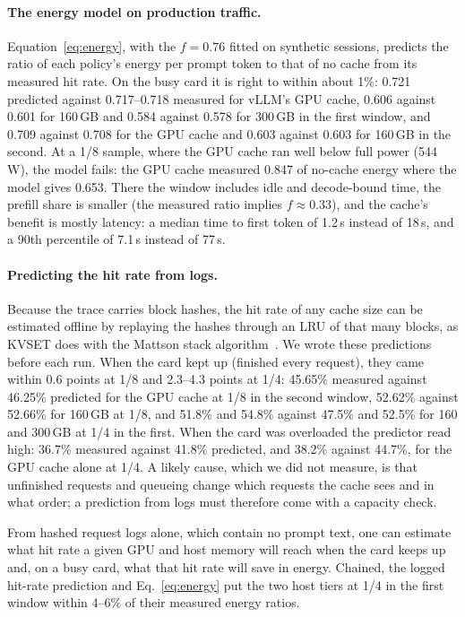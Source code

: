 \paragraph{The energy model on production traffic.} Equation~\eqref{eq:energy}, with the $f=0.76$ fitted on synthetic
sessions, predicts the ratio of each policy's energy per prompt token to that of no cache from its measured hit rate.
On the busy card it is right to within about 1\%: 0.721 predicted against 0.717--0.718 measured for vLLM's GPU cache, 0.606
against 0.601 for 160\,GB and 0.584 against 0.578 for 300\,GB in the first window, and 0.709 against 0.708 for the GPU cache and 0.603 against 0.603 for 160\,GB
in the second. At a 1/8 sample, where the GPU cache ran well below full power (544\,W), the model fails: the GPU cache measured 0.847 of no-cache
energy where the model gives 0.653. There the window includes idle and decode-bound time, the prefill share is smaller
(the measured ratio implies $f\approx0.33$), and the cache's benefit is mostly latency: a median time to first token of
1.2\,s instead of 18\,s, and a 90th percentile of 7.1\,s instead of 77\,s.

\paragraph{Predicting the hit rate from logs.} Because the trace carries block hashes, the hit rate of any cache size
can be estimated offline by replaying the hashes through an LRU of that many blocks, as KVSET does with the Mattson
stack algorithm~\cite{kvset2026,mattson1970evaluation}. We wrote these predictions before each run. When the card kept
up (finished every request), they came within 0.6 points at 1/8 and 2.3--4.3 points at 1/4: 45.65\% measured against 46.25\% predicted for the GPU cache at 1/8 in the second window, 52.62\%
against 52.66\% for 160\,GB at 1/8, and 51.8\% and 54.8\% against 47.5\% and 52.5\% for 160 and 300\,GB at 1/4 in the first. When
the card was overloaded the predictor read high: 36.7\% measured against 41.8\% predicted, and 38.2\% against 44.7\%,
for the GPU cache alone at 1/4. A likely cause, which we did not measure, is that unfinished requests and queueing change which requests the cache
sees and in what order; a prediction from logs must therefore come with a capacity check.

From hashed request logs alone, which contain no prompt text, one can estimate what hit rate a given GPU and host
memory will reach when the card keeps up and, on a busy card, what that hit rate will save in energy. Chained, the
logged hit-rate prediction and Eq.~\eqref{eq:energy} put the two host tiers at 1/4 in the first window within 4--6\% of their measured
energy ratios.
